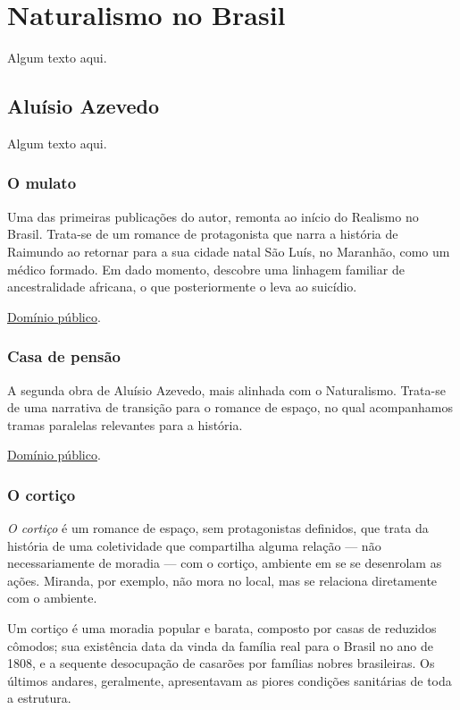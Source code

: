 
\chapter{Naturalismo no Brasil}

Algum texto aqui.

\section{Aluísio Azevedo}

Algum texto aqui.

\subsection{O mulato}

Uma das primeiras publicações do autor, remonta ao início do Realismo no Brasil. Trata-se de um romance de protagonista que narra a história de Raimundo ao retornar para a sua cidade natal São Luís, no Maranhão, como um médico formado. Em dado momento, descobre uma linhagem familiar de ancestralidade africana, o que posteriormente o leva ao suicídio.

\href{http://www.dominiopublico.gov.br/download/texto/bn000166.pdf}{Domínio público}.

\subsection{Casa de pensão}

A segunda obra de Aluísio Azevedo, mais alinhada com o Naturalismo. Trata-se de uma narrativa de transição para o romance de espaço, no qual acompanhamos tramas paralelas relevantes para a história.

\href{http://www.dominiopublico.gov.br/download/texto/bv000014.pdf}{Domínio público}.

\subsection{O cortiço}

\textit{O cortiço} é um romance de espaço, sem protagonistas definidos, que trata da história de uma coletividade que compartilha alguma relação — não necessariamente de moradia — com o cortiço, ambiente em se se desenrolam as ações.  Miranda, por exemplo, não mora no local, mas se relaciona diretamente com o ambiente.

Um cortiço é uma moradia popular e barata, composto por casas de reduzidos cômodos; sua existência data da vinda da família real para o Brasil no ano de 1808, e a sequente desocupação de casarões por famílias nobres brasileiras. Os últimos andares, geralmente, apresentavam as piores condições sanitárias de toda a estrutura.

